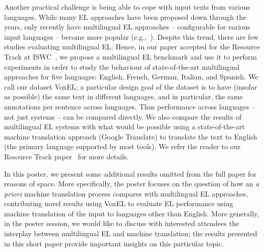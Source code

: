 \documentclass{llncs}
\begin{document}
Another practical challenge is being able to cope with input texts from various languages. While many EL approaches have been proposed down through the years, only recently have multilingual EL approaches -- configurable for various input languages -- become more popular (e.g.,~\cite{ferragina2010tagme,daiber2013improving,Babelfy-moro2014entity,freme-ner2016}). 
%
 Despite this trend, there are few studies evaluating multilingual EL. Hence, in our paper accepted for the Resource Track at ISWC~\cite{ourISWC}, we propose a multilingual EL benchmark and use it to perform experiments in order to study the behaviour of state-of-the-art multilingual approaches for five languages: English, French, German, Italian, and Spanish. We call our dataset VoxEL; a particular design goal of the dataset is to have (insofar as possible) the same text in different languages, and in particular, the same annotations per sentence across languages. Thus performance across languages -- not just systems -- can be compared directly. We also compare the results of multilingual EL systems with what would be possible using a state-of-the-art machine translation approach (Google Translate) to translate the text to English (the primary language supported by most tools). We refer the reader to our Resource Track paper~\cite{ourISWC} for more details.

In this poster, we present some additional results omitted from the full paper for reasons of space. More specifically, the poster focuses on the question of how an \textit{a priori} machine translation process compares with multilingual EL approaches, contributing novel results using VoxEL to evaluate EL performance using machine translation of the input to languages other than English. More generally, in the poster session, we would like to discuss with interested attendees the interplay between multilingual EL and machine translation; the results presented in this short paper provide important insights on this particular topic.
\end{document}
